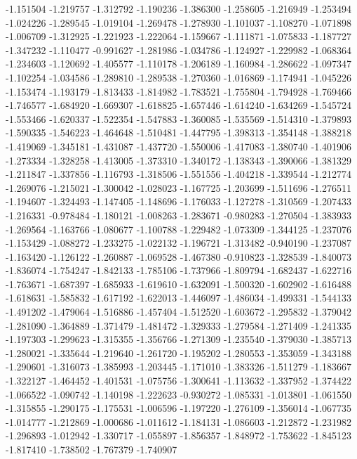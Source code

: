 -1.151504
-1.219757
-1.312792
-1.190236
-1.386300
-1.258605
-1.216949
-1.253494
-1.024226
-1.289545
-1.019104
-1.269478
-1.278930
-1.101037
-1.108270
-1.071898
-1.006709
-1.312925
-1.221923
-1.222064
-1.159667
-1.111871
-1.075833
-1.187727
-1.347232
-1.110477
-0.991627
-1.281986
-1.034786
-1.124927
-1.229982
-1.068364
-1.234603
-1.120692
-1.405577
-1.110178
-1.206189
-1.160984
-1.286622
-1.097347
-1.102254
-1.034586
-1.289810
-1.289538
-1.270360
-1.016869
-1.174941
-1.045226
-1.153474
-1.193179
-1.813433
-1.814982
-1.783521
-1.755804
-1.794928
-1.769466
-1.746577
-1.684920
-1.669307
-1.618825
-1.657446
-1.614240
-1.634269
-1.545724
-1.553466
-1.620337
-1.522354
-1.547883
-1.360085
-1.535569
-1.514310
-1.379893
-1.590335
-1.546223
-1.464648
-1.510481
-1.447795
-1.398313
-1.354148
-1.388218
-1.419069
-1.345181
-1.431087
-1.437720
-1.550006
-1.417083
-1.380740
-1.401906
-1.273334
-1.328258
-1.413005
-1.373310
-1.340172
-1.138343
-1.390066
-1.381329
-1.211847
-1.337856
-1.116793
-1.318506
-1.551556
-1.404218
-1.339544
-1.212774
-1.269076
-1.215021
-1.300042
-1.028023
-1.167725
-1.203699
-1.511696
-1.276511
-1.194607
-1.324493
-1.147405
-1.148696
-1.176033
-1.127278
-1.310569
-1.207433
-1.216331
-0.978484
-1.180121
-1.008263
-1.283671
-0.980283
-1.270504
-1.383933
-1.269564
-1.163766
-1.080677
-1.100788
-1.229482
-1.073309
-1.344125
-1.237076
-1.153429
-1.088272
-1.233275
-1.022132
-1.196721
-1.313482
-0.940190
-1.237087
-1.163420
-1.126122
-1.260887
-1.069528
-1.467380
-0.910823
-1.328539
-1.840073
-1.836074
-1.754247
-1.842133
-1.785106
-1.737966
-1.809794
-1.682437
-1.622716
-1.763671
-1.687397
-1.685933
-1.619610
-1.632091
-1.500320
-1.602902
-1.616488
-1.618631
-1.585832
-1.617192
-1.622013
-1.446097
-1.486034
-1.499331
-1.544133
-1.491202
-1.479064
-1.516886
-1.457404
-1.512520
-1.603672
-1.295832
-1.379042
-1.281090
-1.364889
-1.371479
-1.481472
-1.329333
-1.279584
-1.271409
-1.241335
-1.197303
-1.299623
-1.315355
-1.356766
-1.271309
-1.235540
-1.379030
-1.385713
-1.280021
-1.335644
-1.219640
-1.261720
-1.195202
-1.280553
-1.353059
-1.343188
-1.290601
-1.316073
-1.385993
-1.203445
-1.171010
-1.383326
-1.511279
-1.183667
-1.322127
-1.464452
-1.401531
-1.075756
-1.300641
-1.113632
-1.337952
-1.374422
-1.066522
-1.090742
-1.140198
-1.222623
-0.930272
-1.085331
-1.013801
-1.061550
-1.315855
-1.290175
-1.175531
-1.006596
-1.197220
-1.276109
-1.356014
-1.067735
-1.014777
-1.212869
-1.000686
-1.011612
-1.184131
-1.086603
-1.212872
-1.231982
-1.296893
-1.012942
-1.330717
-1.055897
-1.856357
-1.848972
-1.753622
-1.845123
-1.817410
-1.738502
-1.767379
-1.740907
